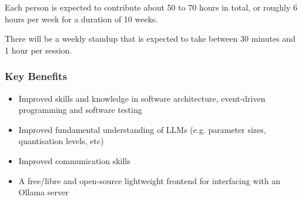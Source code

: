\documentclass[../proposal-for-projects-2025.tex]{subfiles}
\begin{document}
Each person is expected to contribute about 50 to 70 hours in total, or roughly 6 hours per week for a duration of 10 weeks.

There will be a weekly standup that is expected to take between 30 minutes and 1 hour per session.

\subsubsection*{Key Benefits}

\begin{itemize}
    \item Improved skills and knowledge in software architecture, event-driven programming and software testing
    \item Improved fundamental understanding of LLMs (e.g. parameter sizes, quantisation levels, etc)
    \item Improved communication skills
    \item A free/libre and open-source lightweight frontend for interfacing with an Ollama server
\end{itemize}
\end{document}
